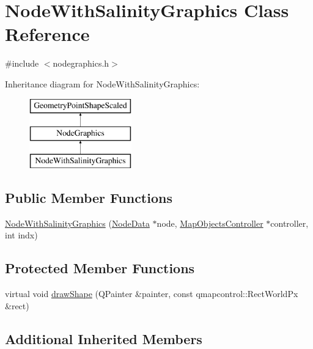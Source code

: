 \hypertarget{class_node_with_salinity_graphics}{}\section{Node\+With\+Salinity\+Graphics Class Reference}
\label{class_node_with_salinity_graphics}


{\ttfamily \#include $<$nodegraphics.\+h$>$}

Inheritance diagram for Node\+With\+Salinity\+Graphics\+:\begin{figure}[H]
\begin{center}
\leavevmode
\includegraphics[height=3.000000cm]{dc/d78/class_node_with_salinity_graphics}
\end{center}
\end{figure}
\subsection*{Public Member Functions}
\begin{DoxyCompactItemize}
\item 
\mbox{\hyperlink{class_node_with_salinity_graphics_a5e87590c189c79794ba31f0e33ba9750}{Node\+With\+Salinity\+Graphics}} (\mbox{\hyperlink{class_node_data}{Node\+Data}} $\ast$node, \mbox{\hyperlink{class_map_objects_controller}{Map\+Objects\+Controller}} $\ast$controller, int indx)
\end{DoxyCompactItemize}
\subsection*{Protected Member Functions}
\begin{DoxyCompactItemize}
\item 
virtual void \mbox{\hyperlink{class_node_with_salinity_graphics_aae2e7137f5cefd4715066d84ce1a3d7a}{draw\+Shape}} (Q\+Painter \&painter, const qmapcontrol\+::\+Rect\+World\+Px \&rect)
\end{DoxyCompactItemize}
\subsection*{Additional Inherited Members}


